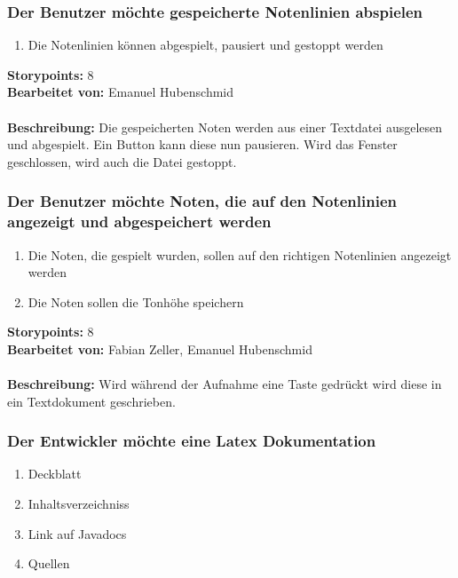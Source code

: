 \subsubsection{Der Benutzer möchte gespeicherte Notenlinien abspielen}

\begin{enumerate}
 \item Die Notenlinien  können abgespielt, pausiert und gestoppt werden
\end{enumerate}

\textbf{Storypoints:} 8 \\
\textbf{Bearbeitet von:} Emanuel Hubenschmid \\
\\
\textbf{Beschreibung:} Die gespeicherten Noten werden aus einer Textdatei ausgelesen und 
abgespielt. Ein Button kann diese nun pausieren. Wird das Fenster geschlossen, wird auch die Datei 
gestoppt.


\subsubsection{Der Benutzer möchte Noten, die auf den Notenlinien angezeigt und abgespeichert 
werden}

\begin{enumerate}
 \item Die Noten, die gespielt wurden, sollen auf den richtigen Notenlinien angezeigt werden
 \item Die Noten sollen die Tonhöhe speichern
\end{enumerate}

\textbf{Storypoints:} 8 \\
\textbf{Bearbeitet von:} Fabian Zeller, Emanuel Hubenschmid \\
\\
\textbf{Beschreibung:} Wird während der Aufnahme eine Taste gedrückt wird diese in ein Textdokument 
geschrieben.


\subsubsection{Der Entwickler möchte eine Latex Dokumentation}

\begin{enumerate}
 \item Deckblatt
 \item Inhaltsverzeichniss
 \item Link auf Javadocs
 \item Quellen
\end{enumerate}

